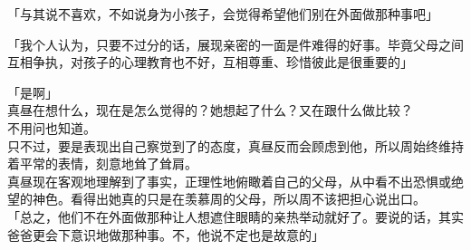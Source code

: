 「与其说不喜欢，不如说身为小孩子，会觉得希望他们别在外面做那种事吧」

「我个人认为，只要不过分的话，展现亲密的一面是件难得的好事。毕竟父母之间互相争执，对孩子的心理教育也不好，互相尊重、珍惜彼此是很重要的」

「是啊」\\

真昼在想什么，现在是怎么觉得的？她想起了什么？又在跟什么做比较？\\

不用问也知道。\\

只不过，要是表现出自己察觉到了的态度，真昼反而会顾虑到他，所以周始终维持着平常的表情，刻意地耸了耸肩。\\

真昼现在客观地理解到了事实，正理性地俯瞰着自己的父母，从中看不出恐惧或绝望的神色。看得出她真的只是在羡慕周的父母，所以周不该把担心说出口。\\

「总之，他们不在外面做那种让人想遮住眼睛的亲热举动就好了。要说的话，其实爸爸更会下意识地做那种事。不，他说不定也是故意的」

